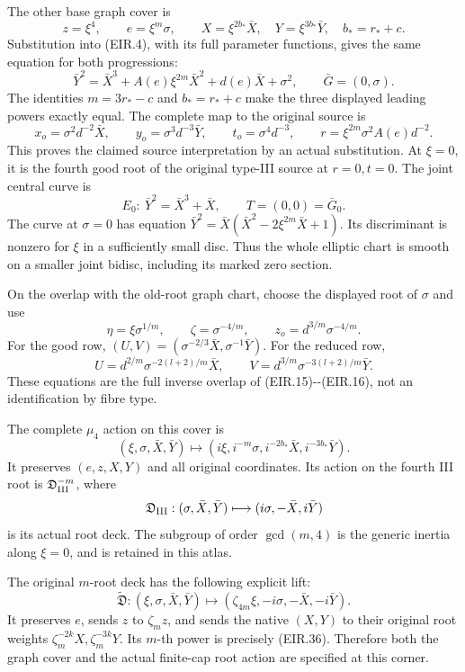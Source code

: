 \par\nobreak

The other base graph cover is
\[
 z=\xi^4,\qquad e=\xi^m\sigma,
 \qquad X=\xi^{2b_*}\bar X,\quad Y=\xi^{3b_*}\bar Y,
 \quad b_*=r_*+c.
 \tag{EIR.30}
\]
Substitution into (EIR.4), with its full parameter functions,
gives the same equation for both progressions:
\[
 \bar Y^2=\bar X^3+A(e)\xi^{2m}\bar X^2
                    +d(e)\bar X+\sigma^2,
 \qquad \bar G=(0,\sigma).
 \tag{EIR.31}
\]
The identities \(m=3r_*-c\) and \(b_*=r_*+c\) make the
three displayed leading powers exactly equal. The complete
map to the original source is
\[
 x_o=\sigma^2d^{-2}\bar X,\qquad
 y_o=\sigma^3d^{-3}\bar Y,\qquad
 t_o=\sigma^4d^{-3},\qquad
 r=\xi^{2m}\sigma^2A(e)d^{-2}.
 \tag{EIR.32}
\]
This proves the claimed source interpretation by an actual
substitution. At \(\xi=0\), it is the fourth good root of
the original type-III source at \(r=0,t=0\). The joint central
curve is
\[
 E_0:\ \bar Y^2=\bar X^3+\bar X,\qquad
 T=(0,0)=\bar G_0.
 \tag{EIR.33}
\]
The curve at \(\sigma=0\) has equation
\(\bar Y^2=\bar X(\bar X^2-2\xi^{2m}\bar X+1)\).
Its discriminant is nonzero for \(\xi\) in a sufficiently
small disc. Thus the whole elliptic chart is smooth on a
smaller joint bidisc, including its marked zero section.

On the overlap with the old-root graph chart, choose the
displayed root of \(\sigma\) and use
\[
 \eta=\xi\sigma^{1/m},\qquad
 \zeta=\sigma^{-4/m},\qquad z_o=d^{3/m}\sigma^{-4/m}.
 \tag{EIR.34}
\]
For the good row,
\((U,V)=(\sigma^{-2/3}\bar X,\sigma^{-1}\bar Y)\).
For the reduced row,
\[
 U=d^{2/m}\sigma^{-2(l+2)/m}\bar X,\qquad
 V=d^{3/m}\sigma^{-3(l+2)/m}\bar Y.
 \tag{EIR.35}
\]
These equations are the full inverse overlap of
(EIR.15)-\/-(EIR.16), not an identification by fibre type.

The complete \(\mu_4\) action on this cover is
\[
 (\xi,\sigma,\bar X,\bar Y)\longmapsto
 (i\xi,i^{-m}\sigma,i^{-2b_*}\bar X,i^{-3b_*}\bar Y).
 \tag{EIR.36}
\]
It preserves \((e,z,X,Y)\) and all original coordinates.
Its action on the fourth III root is
\(\mathfrak D_{\rm III}^{-m}\), where
\[
 \mathfrak D_{\rm III}:
 (\sigma,\bar X,\bar Y)\longmapsto(i\sigma,-\bar X,i\bar Y)
\]
is its actual root deck. The subgroup of order
\(\gcd(m,4)\) is the generic inertia along \(\xi=0\),
and is retained in this atlas.

The original \(m\)-root deck has the following explicit lift:
\[
 \widetilde{\mathfrak D}:
 (\xi,\sigma,\bar X,\bar Y)\longmapsto
 (\zeta_{4m}\xi,-i\sigma,-\bar X,-i\bar Y).
 \tag{EIR.37}
\]
It preserves \(e\), sends \(z\) to \(\zeta_mz\), and sends
the native \((X,Y)\) to their original root weights
\(\zeta_m^{-2k}X,\zeta_m^{-3k}Y\). Its \(m\)-th power
is precisely (EIR.36). Therefore both the graph cover and the
actual finite-cap root action are specified at this corner.

